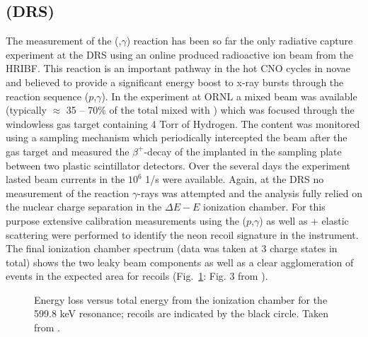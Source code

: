 \subsection{ (DRS) }
The measurement of the  (,$\gamma$) reaction has been so far the only radiative capture experiment at the DRS using an online produced radioactive ion beam from the HRIBF. This reaction is an important pathway in the hot CNO cycles in novae and believed to provide a significant energy boost to x-ray bursts through the reaction sequence ($p$,$\gamma$). In the experiment at ORNL a mixed  beam was available (typically  $\approx$ 35 -- 70\% of the total mixed with ) which was focused through the windowless gas target containing 4 Torr of Hydrogen. The  content was monitored using a sampling mechanism which periodically intercepted the beam after the gas target and measured the $\beta^+$-decay of the  implanted in the sampling plate between two plastic scintillator detectors. Over the several days the experiment lasted beam currents in the $10^6$ 1/s were available. Again, at the DRS no measurement of the reaction $\gamma$-rays was attempted and the analysis fully relied on the nuclear charge separation in the $\Delta{}E-E$ ionization chamber. For this purpose extensive calibration measurements using the ($p$,$\gamma$) as well as + elastic scattering were performed to identify the neon recoil signature in the instrument. The final ionization chamber spectrum (data was taken at 3 charge states in total) shows the two leaky beam components as well as a clear agglomeration of events in the expected area for  recoils (Fig.\ \ref{fig:chipp09a_3}: Fig. 3 from \cite{chip09a}).
\begin{figure}
\caption{Energy loss versus total energy from the ionization chamber for the 599.8 keV resonance;  recoils are indicated by the black circle. Taken from \cite{chip09a}.}
\label{fig:chipp09a_3}
\end{figure}
